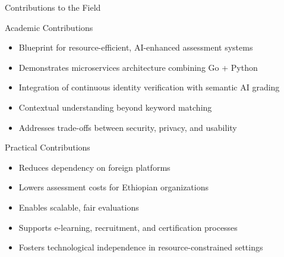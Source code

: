 \begin{frame}{Contributions to the Field}
    \begin{block}{Academic Contributions}
        \begin{itemize}
            \item Blueprint for resource-efficient, AI-enhanced assessment systems
            \item Demonstrates microservices architecture combining Go + Python
            \item Integration of continuous identity verification with semantic AI grading
            \item Contextual understanding beyond keyword matching
            \item Addresses trade-offs between security, privacy, and usability
        \end{itemize}
    \end{block}
    
    \begin{block}{Practical Contributions}
        \begin{itemize}
            \item Reduces dependency on foreign platforms
            \item Lowers assessment costs for Ethiopian organizations
            \item Enables scalable, fair evaluations
            \item Supports e-learning, recruitment, and certification processes
            \item Fosters technological independence in resource-constrained settings
        \end{itemize}
    \end{block}
\end{frame}

